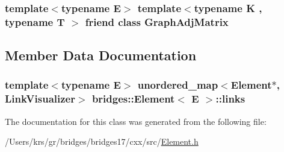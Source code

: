 \subsubsection[{Graph\+Adj\+Matrix}]{\setlength{\rightskip}{0pt plus 5cm}template$<$typename E$>$ template$<$typename K , typename T $>$ friend class {\bf Graph\+Adj\+Matrix}\hspace{0.3cm}{\ttfamily [friend]}}\label{classbridges_1_1_element_ae8ba4af32b14c8ac8a3f8f861e914444}


\subsection{Member Data Documentation}
\hypertarget{classbridges_1_1_element_a6fb53728edc378f26238543b26238496}{}
\subsubsection[{links}]{\setlength{\rightskip}{0pt plus 5cm}template$<$typename E$>$ unordered\+\_\+map$<${\bf Element}$\ast$, {\bf Link\+Visualizer}$>$ {\bf bridges\+::\+Element}$<$ E $>$\+::links\hspace{0.3cm}{\ttfamily [protected]}}\label{classbridges_1_1_element_a6fb53728edc378f26238543b26238496}


The documentation for this class was generated from the following file\+:\begin{DoxyCompactItemize}
\item 
/\+Users/krs/gr/bridges/bridges17/cxx/src/\hyperlink{_element_8h}{Element.\+h}\end{DoxyCompactItemize}
